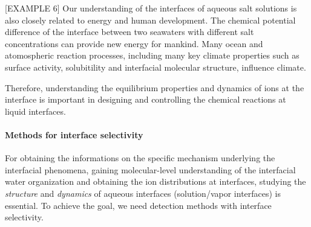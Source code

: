 
[EXAMPLE 6]
Our understanding of the interfaces of aqueous salt solutions is also closely related to energy and human development. 
The chemical potential difference of the interface between two seawaters with different salt concentrations can provide new energy for mankind\cite{Pattle1954,Loeb1976}. 
Many ocean and atomospheric reaction processes, including many key climate properties such as surface activity, 
solubitility and interfacial molecular structure, influence climate\cite{Schill2015,Cochran2017}. 

Therefore, understanding the equilibrium properties and dynamics of ions at the interface is important in designing and controlling the chemical reactions at liquid interfaces\cite{Chang06}. 

\paragraph{Methods for interface selectivity}
For obtaining the informations on the specific mechanism underlying the interfacial phenomena,
gaining molecular-level understanding of the interfacial water organization and obtaining the ion distributions at interfaces,
studying the \emph{structure} and \emph{dynamics} of aqueous interfaces (solution/vapor interfaces) is essential.
To achieve the goal, we need detection methods with interface selectivity. 

